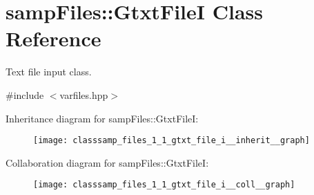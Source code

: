 \hypertarget{classsamp_files_1_1_gtxt_file_i}{}\section{samp\+Files\+:\+:Gtxt\+FileI Class Reference}
\label{classsamp_files_1_1_gtxt_file_i}


Text file input class.  




{\ttfamily \#include $<$varfiles.\+hpp$>$}



Inheritance diagram for samp\+Files\+:\+:Gtxt\+FileI\+:\nopagebreak
\begin{figure}[H]
\begin{center}
\leavevmode
\texttt{[image: classsamp\_files\_1\_1\_gtxt\_file\_i\_\_inherit\_\_graph]}
\end{center}
\end{figure}


Collaboration diagram for samp\+Files\+:\+:Gtxt\+FileI\+:\nopagebreak
\begin{figure}[H]
\begin{center}
\leavevmode
\texttt{[image: classsamp\_files\_1\_1\_gtxt\_file\_i\_\_coll\_\_graph]}
\end{center}
\end{figure}
